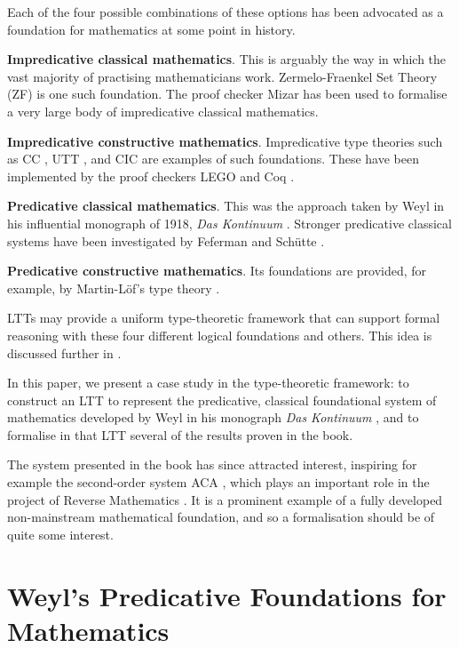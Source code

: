 \documentclass[acmtocl]{acmtrans2m}
\begin{document}
Each of the four possible combinations of these
options has been advocated as a foundation for mathematics at
some point in history.
\begin{longitem}
\item
\textbf{Impredicative classical mathematics}. This is arguably the way in
which the vast majority of practising mathematicians work.
Zermelo-Fraenkel Set Theory (ZF) is one such foundation.  The proof checker Mizar \cite{muzalewski:mizar} has been used to formalise a very large body of impredicative classical mathematics.
\item
\textbf{Impredicative constructive mathematics}.  Impredicative
type theories such as CC \cite{ch:coc}, UTT \cite{luo:car}, and CIC \cite{coq'art}
are examples of such foundations.  These have been implemented by the proof checkers LEGO \cite{legoWWW} and Coq \cite{Coq:manual}.
\item
\textbf{Predicative classical mathematics}.  This was the approach
taken by Weyl in his influential monograph of 1918, \emph{Das
Kontinuum} \cite{weyl:kontinuum}.  Stronger predicative classical systems have been investigated by Feferman \cite{feferman:spa} and Sch\"utte \cite{schutte:pwo}.
\item
\textbf{Predicative constructive mathematics}.  Its foundations are
provided, for example, by Martin-L\"{o}f's type theory
\cite{pmltt,ml:itt}.
\end{longitem}

LTTs may provide a uniform type-theoretic framework that can
support formal reasoning with these four different logical foundations and others.  This idea is discussed further in
\cite{luo:LTT06}.

In this paper, we present a case study in the type-theoretic
framework: to construct an LTT to represent the predicative, classical foundational system of mathematics
developed by Weyl in his monograph \textit{Das Kontinuum}
\cite{weyl:kontinuum}, and to formalise in that LTT several of
the results proven in the book.

The system presented in the
book has since attracted interest, inspiring for example the
second-order system ACA \cite{feferman:kontinuum}, which plays
an important role in the project of Reverse Mathematics
\cite{simpson:sosoa}.  It is a prominent example of a fully
developed non-mainstream mathematical foundation, and so a
formalisation should be of quite some interest.

\section{Weyl's Predicative Foundations for Mathematics}
\label{section:weyl}
\end{document}
